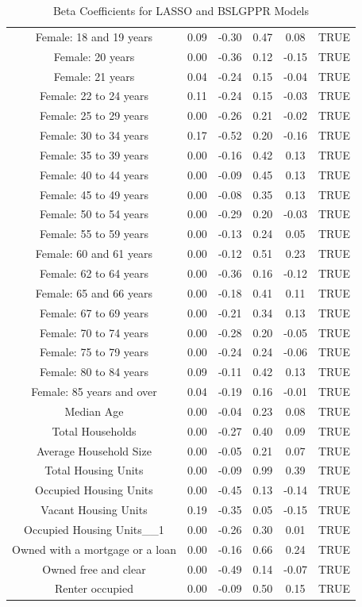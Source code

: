 \documentclass{article} %
\begin{document}
\begin{table}[H]
\begin{adjustbox}{width = \textwidth}
\begin{tabular}{cccccc}
  Female: 18 and 19 years & 0.09 & -0.30 & 0.47 & 0.08 & TRUE \\ 
  Female: 20 years & 0.00 & -0.36 & 0.12 & -0.15 & TRUE \\ 
  Female: 21 years & 0.04 & -0.24 & 0.15 & -0.04 & TRUE \\ 
  Female: 22 to 24 years & 0.11 & -0.24 & 0.15 & -0.03 & TRUE \\ 
  Female: 25 to 29 years & 0.00 & -0.26 & 0.21 & -0.02 & TRUE \\ 
  Female: 30 to 34 years & 0.17 & -0.52 & 0.20 & -0.16 & TRUE \\ 
  Female: 35 to 39 years & 0.00 & -0.16 & 0.42 & 0.13 & TRUE \\ 
  Female: 40 to 44 years & 0.00 & -0.09 & 0.45 & 0.13 & TRUE \\ 
  Female: 45 to 49 years & 0.00 & -0.08 & 0.35 & 0.13 & TRUE \\ 
  Female: 50 to 54 years & 0.00 & -0.29 & 0.20 & -0.03 & TRUE \\ 
  Female: 55 to 59 years & 0.00 & -0.13 & 0.24 & 0.05 & TRUE \\ 
  Female: 60 and 61 years & 0.00 & -0.12 & 0.51 & 0.23 & TRUE \\ 
  Female: 62 to 64 years & 0.00 & -0.36 & 0.16 & -0.12 & TRUE \\ 
  Female: 65 and 66 years & 0.00 & -0.18 & 0.41 & 0.11 & TRUE \\ 
  Female: 67 to 69 years & 0.00 & -0.21 & 0.34 & 0.13 & TRUE \\ 
  Female: 70 to 74 years & 0.00 & -0.28 & 0.20 & -0.05 & TRUE \\ 
  Female: 75 to 79 years & 0.00 & -0.24 & 0.24 & -0.06 & TRUE \\ 
  Female: 80 to 84 years & 0.09 & -0.11 & 0.42 & 0.13 & TRUE \\ 
  Female: 85 years and over & 0.04 & -0.19 & 0.16 & -0.01 & TRUE \\ 
  Median Age & 0.00 & -0.04 & 0.23 & 0.08 & TRUE \\ 
  Total Households & 0.00 & -0.27 & 0.40 & 0.09 & TRUE \\ 
  Average Household Size & 0.00 & -0.05 & 0.21 & 0.07 & TRUE \\ 
  Total Housing Units & 0.00 & -0.09 & 0.99 & 0.39 & TRUE \\ 
  Occupied Housing Units & 0.00 & -0.45 & 0.13 & -0.14 & TRUE \\ 
  Vacant Housing Units & 0.19 & -0.35 & 0.05 & -0.15 & TRUE \\ 
  Occupied Housing Units\_\_1 & 0.00 & -0.26 & 0.30 & 0.01 & TRUE \\ 
  Owned with a mortgage or a loan & 0.00 & -0.16 & 0.66 & 0.24 & TRUE \\ 
  Owned free and clear & 0.00 & -0.49 & 0.14 & -0.07 & TRUE \\ 
  Renter occupied & 0.00 & -0.09 & 0.50 & 0.15 & TRUE \\ 
   \hline
\end{tabular}
\end{adjustbox}
\caption{Beta Coefficients for LASSO and BSLGPPR Models}
\label{table:betacoef}
\end{table}
\end{document}

